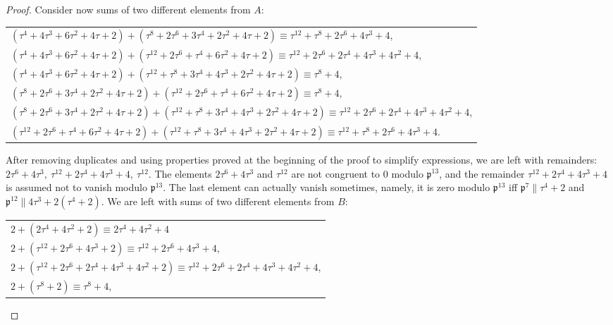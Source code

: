 \documentclass[12pt]{article}
\theoremstyle{remark}
\begin{document}
\begin{proof}
Consider now sums of two different elements from $A$: 
\begin{center}
\begin{tabular}{@{}l@{}}
    $(\tau^4 + 4\tau^3 + 6\tau^2 + 4\tau +2) + (\tau^8 + 2\tau^6 + 3\tau^4 + 2\tau^2 + 4\tau + 2) \equiv  \tau^{12}+\tau^8+2\tau^6 + 4\tau^3+4$,\\
    $(\tau^4 + 4\tau^3 + 6\tau^2 + 4\tau +2) + (\tau^{12} + 2\tau^6 + \tau^4 + 6\tau^2 + 4\tau +2) \equiv \tau^{12} +2\tau^6 + 2\tau^4 + 4\tau^3+4\tau^2+4 $,\\
    $(\tau^4 + 4\tau^3 + 6\tau^2 + 4\tau +2) + (\tau^{12}+\tau^8+3\tau^4+4\tau^3+2\tau^2+4\tau+2) \equiv \tau^{8}+4 $,\\
    $(\tau^8 + 2\tau^6 + 3\tau^4 + 2\tau^2 + 4\tau + 2) + (\tau^{12} + 2\tau^6 + \tau^4 + 6\tau^2 + 4\tau +2) \equiv \tau^{8}+4 $,\\
    $(\tau^8 + 2\tau^6 + 3\tau^4 + 2\tau^2 + 4\tau + 2) + (\tau^{12}+\tau^8+3\tau^4+4\tau^3+2\tau^2+4\tau+2) \equiv \tau^{12} +2\tau^6 + 2\tau^4+4\tau^3+4\tau^2+4 $,\\
    $(\tau^{12} + 2\tau^6 + \tau^4 + 6\tau^2 + 4\tau +2) + (\tau^{12}+\tau^8+3\tau^4+4\tau^3+2\tau^2+4\tau+2) \equiv \tau^{12}+\tau^8+2\tau^6 + 4\tau^3+4 $.
\end{tabular}
\end{center}
After removing duplicates and using properties proved at the beginning of the proof to simplify expressions, we are left with remainders: $2\tau^6+4\tau^3,\  \tau^{12}+2\tau^4+4\tau^3+4, \ \tau^{12}.$
The elements $2\tau^6 + 4\tau^3$ and $\tau^{12}$ are not congruent to 0 modulo $\mathfrak{p}^{13}$, and the remainder $\tau^{12} + 2\tau^4+4\tau^3+4$ is assumed not to vanish modulo $\mathfrak{p}^{13}$. The last element can actually vanish sometimes, namely, it is zero modulo $\mathfrak{p}^{13}$ iff $\mathfrak{p}^{7} \parallel \tau^4+2$ and $\mathfrak{p}^{12} \parallel 4\tau^3 + 2(\tau^4+2)$. We are left with sums of two different elements from $B$:
\begin{center}
\begin{tabular}{@{}l@{}}
    $2 + (2\tau^4+4\tau^2+2) \equiv 2\tau^4+4\tau^2+4$\\
    $2 + (\tau^{12}+2\tau^6+4\tau^3+2) \equiv \tau^{12} + 2\tau^6 + 4\tau^3 + 4$, \\
    $2 + (\tau^{12}+ 2\tau^6 + 2\tau^4 + 4\tau^3 + 4\tau^2 + 2) \equiv \tau^{12} + 2\tau^6 +2\tau^4 + 4\tau^3  +4\tau^2+ 4$, \\
    $2 + (\tau^8 + 2) \equiv \tau^{8}+4$, \\

\end{tabular}
\end{center}
\end{proof}
\end{document}
